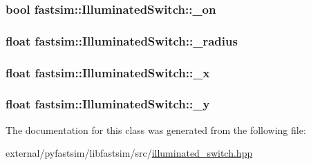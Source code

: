 \subsubsection[{\texorpdfstring{\+\_\+on}{_on}}]{\setlength{\rightskip}{0pt plus 5cm}bool fastsim\+::\+Illuminated\+Switch\+::\+\_\+on\hspace{0.3cm}{\ttfamily [protected]}}\hypertarget{classfastsim_1_1_illuminated_switch_a159fe2f58f156f5fceec14998739918d}{}\label{classfastsim_1_1_illuminated_switch_a159fe2f58f156f5fceec14998739918d}
\subsubsection[{\texorpdfstring{\+\_\+radius}{_radius}}]{\setlength{\rightskip}{0pt plus 5cm}float fastsim\+::\+Illuminated\+Switch\+::\+\_\+radius\hspace{0.3cm}{\ttfamily [protected]}}\hypertarget{classfastsim_1_1_illuminated_switch_ac204dfa0671fc1d860ab19371a15dcf9}{}\label{classfastsim_1_1_illuminated_switch_ac204dfa0671fc1d860ab19371a15dcf9}
\subsubsection[{\texorpdfstring{\+\_\+x}{_x}}]{\setlength{\rightskip}{0pt plus 5cm}float fastsim\+::\+Illuminated\+Switch\+::\+\_\+x\hspace{0.3cm}{\ttfamily [protected]}}\hypertarget{classfastsim_1_1_illuminated_switch_a5dca28e3c3202f405cae1d81fceb4e14}{}\label{classfastsim_1_1_illuminated_switch_a5dca28e3c3202f405cae1d81fceb4e14}
\subsubsection[{\texorpdfstring{\+\_\+y}{_y}}]{\setlength{\rightskip}{0pt plus 5cm}float fastsim\+::\+Illuminated\+Switch\+::\+\_\+y\hspace{0.3cm}{\ttfamily [protected]}}\hypertarget{classfastsim_1_1_illuminated_switch_af1f3ac22f8c8b938dcfa62efa2d322bd}{}\label{classfastsim_1_1_illuminated_switch_af1f3ac22f8c8b938dcfa62efa2d322bd}


The documentation for this class was generated from the following file\+:\begin{DoxyCompactItemize}
\item 
external/pyfastsim/libfastsim/src/\hyperlink{illuminated__switch_8hpp}{illuminated\+\_\+switch.\+hpp}\end{DoxyCompactItemize}
